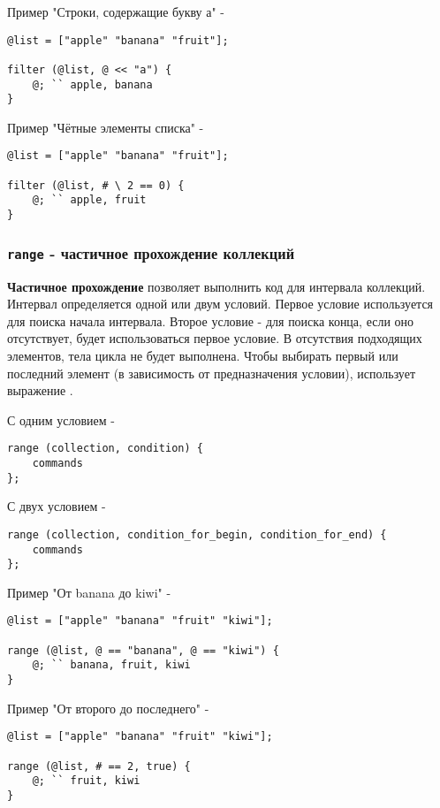 \documentclass[a4paper, 14pt]{extarticle}
\begin{document}
\noindent Пример "Строки, содержащие букву а" -
\begin{lstlisting}
@list = ["apple" "banana" "fruit"];

filter (@list, @ << "a") {
	@; `` apple, banana
}
\end{lstlisting}

\noindent Пример "Чётные элементы списка" -
\begin{lstlisting}
@list = ["apple" "banana" "fruit"];

filter (@list, # \ 2 == 0) {
	@; `` apple, fruit
}
\end{lstlisting}

\subsubsection{\lstinline`range` - частичное прохождение коллекций}

{\bf Частичное прохождение} позволяет выполнить код для интервала коллекций. Интервал определяется одной или двум условий. Первое условие используется для поиска начала интервала. Второе условие - для поиска конца, если оно отсутствует, будет использоваться первое условие. В отсутствия подходящих элементов, тела цикла не будет выполнена. Чтобы выбирать первый или последний элемент (в зависимость от предназначения условии), использует выражение \true.

\noindent С одним условием -
\begin{lstlisting}[numbers=none]
range (collection, condition) {
	commands
};
\end{lstlisting}

\noindent С двух условием -
\begin{lstlisting}[numbers=none]
range (collection, condition_for_begin, condition_for_end) {
	commands
};
\end{lstlisting}

\noindent Пример "От banana до kiwi" -
\begin{lstlisting}
@list = ["apple" "banana" "fruit" "kiwi"];

range (@list, @ == "banana", @ == "kiwi") {
	@; `` banana, fruit, kiwi
}
\end{lstlisting}

\noindent Пример "От второго до последнего" -
\begin{lstlisting}
@list = ["apple" "banana" "fruit" "kiwi"];

range (@list, # == 2, true) {
	@; `` fruit, kiwi
}
\end{lstlisting}
\end{document}
